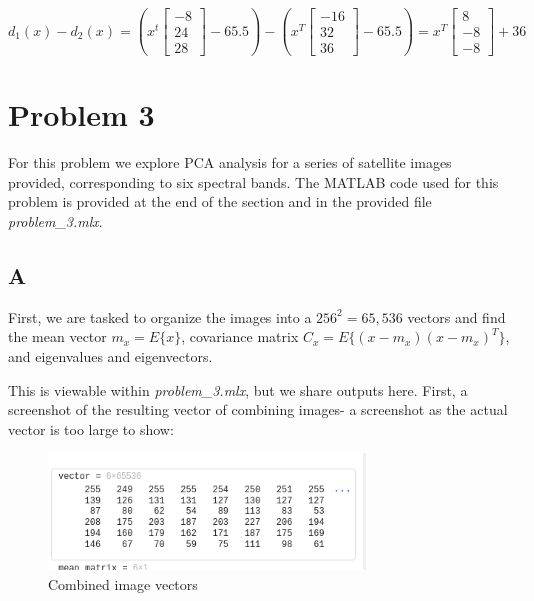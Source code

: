 \documentclass{article}
\begin{document}
\begin{equation}
    d_1(x)-d_2(x)=( x^t \begin{bmatrix}-8 \\ 24 \\ 28\end{bmatrix} - 65.5) - (x^T \begin{bmatrix}-16 \\ 32 \\ 36\end{bmatrix} - 65.5) = x^T \begin{bmatrix}
        8 \\ -8 \\ -8
    \end{bmatrix} + 36
\end{equation}

\section*{Problem 3}

For this problem we explore PCA analysis for a series of satellite images provided, corresponding to six spectral bands. The MATLAB code used for this problem is provided at the end of the section and in the provided file \textit{problem\_3.mlx}.

\subsection*{A}

First, we are tasked to organize the images into a $256^2 = 65,536$ vectors and find the mean vector $m_x=E\{ x\}$, covariance matrix $C_x = E\{ (x-m_x)(x-m_x)^T \}$, and eigenvalues and eigenvectors.

This is viewable within \textit{problem\_3.mlx}, but we share outputs here. First, a screenshot of the resulting vector of combining images-  a screenshot as the actual vector is too large to show:

\begin{figure}[H]
    \centering
    \includegraphics[width = 0.75\textwidth]{imgs/3a1.png}
    \caption{Combined image vectors}
    \label{fig:3a1}
\end{figure}
\end{document}
